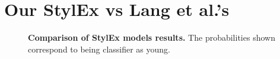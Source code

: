 \newpage
\label{sec:appendix}
\section{Our StylEx vs Lang et al.'s}
\label{app:A}

\begin{figure}[h]
    \centering
  \caption{\centering \textbf{Comparison of StylEx models results.} The probabilities shown correspond to being classifier as young.}
  \label{fig:PyTorch vs TensorFlow classifier}
\end{figure}

